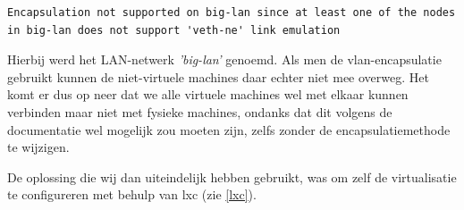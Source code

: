 \begin{lstlisting}
Encapsulation not supported on big-lan since at least one of the nodes in big-lan does not support 'veth-ne' link emulation
\end{lstlisting}

Hierbij werd het LAN-netwerk \textit{'big-lan'} genoemd.
Als men de vlan-encapsulatie gebruikt kunnen de niet-virtuele machines daar echter niet mee overweg.
Het komt er dus op neer dat we alle virtuele machines wel met elkaar kunnen verbinden maar niet met fysieke machines,
ondanks dat dit volgens de documentatie wel mogelijk zou moeten zijn, zelfs zonder de encapsulatiemethode te wijzigen\cite{vwall-openvz}.

De oplossing die wij dan uiteindelijk hebben gebruikt, was om zelf de virtualisatie te configureren met behulp van \gls{lxc} (zie \cref{lxc}).